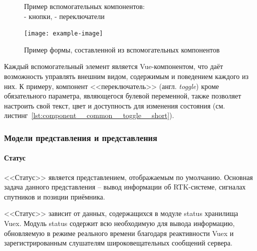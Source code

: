 \begin{figure}[h!]
  \centering
  \setlength{\fboxsep}{5pt}
  \qquad
  \vspace*{6pt}
  \caption{
    Пример вспомогательных компонентов:\\
    \protect{} - кнопки,
    \protect{} - переключатели
  }
  \label{fig:common-components}
\end{figure}

\begin{figure}[h!]
  \centering
  \setlength{\fboxsep}{5pt}
  \texttt{[image: example-image]}
  \vspace*{6pt}
  \caption{Пример формы, составленной из вспомогательных компонентов}
  \label{fig:form-example}
\end{figure}

Каждый вспомогательный элемент является Vue-компонентом, что даёт возможность управлять внешним видом, содержимым и поведением каждого из них. К примеру, компонент <<переключатель>> (англ. \emph{toggle}) кроме обязательного параметра, являющегося булевой переменной, также позволяет настроить свой текст, цвет и доступность для изменения состояния (см. листинг~\ref{lst:component__common__toggle__short}).

\newpage




\subsubsection{Модели представления и представления}

\paragraph{Статус}

<<Статус>> является представлением, отображаемым по умолчанию. Основная задача данного представления -- вывод информации об RTK-системе, сигналах спутников и позиции приёмника.

<<Статус>> зависит от данных, содержащихся в модуле status хранилища Vuex. Модуль status содержит всю необходимую для вывода информацию, обновляемую в режиме реального времени благодаря реактивности Vuex и зарегистрированным слушателям широковещательных сообщений сервера.

